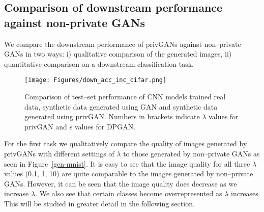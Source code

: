 \documentclass{article}
\begin{document}
\subsection{Comparison of downstream performance against non-private GANs}
We compare the downstream performance of privGANs against non--private GANs in two ways: i) qualitative comparison of the generated images, ii) quantitative comparison on a downstream classification task. 


\begin{figure}[h!]
    \centering
    \texttt{[image: Figures/down\_acc\_inc\_cifar.png]}
    \caption{Comparison of test--set performance of CNN models trained real data, synthetic data generated using GAN and synthetic data generated using privGAN. Numbers in brackets indicate $\lambda$ values for privGAN and $\epsilon$ values for DPGAN.}
    \label{down-acc}
\end{figure}


For the first task we qualitatively compare the quality of images generated by privGANs with different settings of $\lambda$ to those generated by non--private GANs as seen in Figure~\ref{gen-mnist}. It is easy to see that the image quality for all three $\lambda$ values (0.1, 1, 10) are quite comparable to the images generated by non--private GANs. However, it can be seen that the image quality does decrease as we increase $\lambda$. We also see that certain classes become overrepresented as $\lambda$ increases. This will be studied in greater detail in the following section. 
\end{document}
